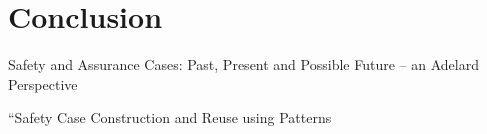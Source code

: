 \section{Conclusion}


Safety and Assurance Cases: Past, Present and Possible Future – an Adelard Perspective

“Safety Case Construction
and Reuse using Patterns
